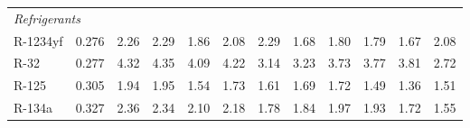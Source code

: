 \begin{table}[H]
\begin{tabular}{lccccccccccc}
\multicolumn{15}{l}{\emph{Refrigerants}} \\
R-1234yf & 0.276 & 2.26 & 2.29 & 1.86 & 2.08 & 2.29 & 1.68 & 1.80 & 1.79 & 1.67 & 2.08 \\
R-32 & 0.277 & 4.32 & 4.35 & 4.09 & 4.22 & 3.14 & 3.23 & 3.73 & 3.77 & 3.81 & 2.72 \\
R-125 & 0.305 & 1.94 & 1.95 & 1.54 & 1.73 & 1.61 & 1.69 & 1.72 & 1.49 & 1.36 & 1.51 \\
R-134a & 0.327 & 2.36 & 2.34 & 2.10 & 2.18 & 1.78 & 1.84 & 1.97 & 1.93 & 1.72 & 1.55 \\
\bottomrule
\end{tabular}
\end{table}
